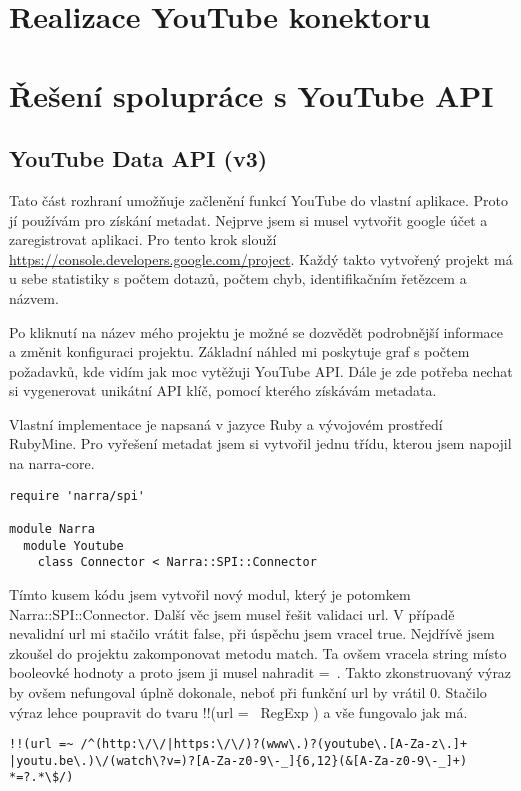 \section{Realizace YouTube konektoru}
\section{Řešení spolupráce s YouTube API}
\subsection{YouTube Data API (v3)}
\par Tato část rozhraní umožňuje začlenění funkcí YouTube do vlastní aplikace. Proto jí používám pro získání metadat. Nejprve jsem si musel vytvořit google účet a zaregistrovat aplikaci. Pro tento krok slouží \url{https://console.developers.google.com/project}. Každý takto vytvořený projekt má u sebe statistiky s počtem dotazů, počtem chyb, identifikačním řetězcem a názvem. 
\par Po kliknutí na název mého projektu je možné se dozvědět podrobnější informace a změnit konfiguraci projektu. Základní náhled mi poskytuje graf s počtem požadavků, kde vidím jak moc vytěžuji YouTube API. Dále je zde potřeba nechat si vygenerovat unikátní API klíč, pomocí kterého získávám metadata.
\par Vlastní implementace je napsaná v jazyce Ruby a vývojovém prostředí RubyMine. Pro vyřešení metadat jsem si vytvořil jednu třídu, kterou jsem napojil na narra-core. 
\begin{verbatim}
require 'narra/spi'

module Narra
  module Youtube
    class Connector < Narra::SPI::Connector
\end{verbatim}
\par Tímto kusem kódu jsem vytvořil nový modul, který je potomkem Narra::SPI::Connector. Další věc jsem musel řešit validaci url. V případě nevalidní url mi stačilo vrátit false, při úspěchu jsem vracel true. Nejdřívě jsem zkoušel do projektu zakomponovat metodu match. Ta ovšem vracela string místo booleovké hodnoty a proto jsem ji musel nahradit =~. Takto zkonstruovaný výraz by ovšem nefungoval úplně dokonale, neboť při funkční url by vrátil 0. Stačilo výraz lehce poupravit do tvaru !!(url =~ RegExp ) a vše fungovalo jak má.
\begin{verbatim}
!!(url =~ /^(http:\/\/|https:\/\/)?(www\.)?(youtube\.[A-Za-z\.]+
|youtu.be\.)\/(watch\?v=)?[A-Za-z0-9\-_]{6,12}(&[A-Za-z0-9\-_]+)
*=?.*\$/)
\end{verbatim}
